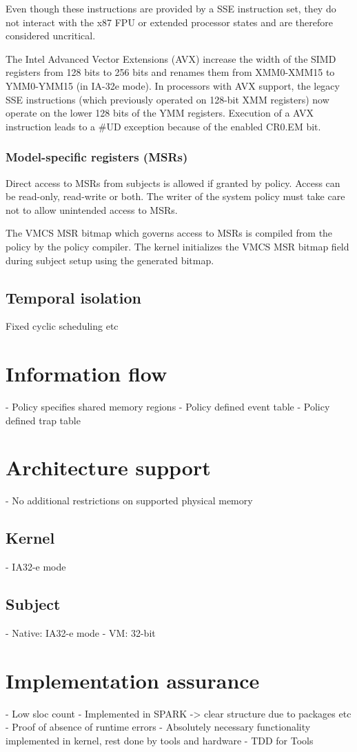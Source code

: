 Even though these instructions are provided by a SSE instruction set, they do
not interact with the x87 FPU or extended processor states and are therefore
considered uncritical.

The Intel Advanced Vector Extensions (AVX) increase the width of the
SIMD registers from 128 bits to 256 bits and renames them from XMM0-XMM15 to
YMM0-YMM15 (in IA-32e mode). In processors with AVX support, the legacy SSE
instructions (which previously operated on 128-bit XMM registers) now operate on
the lower 128 bits of the YMM registers. Execution of a AVX instruction leads to
a \#UD exception because of the enabled CR0.EM bit.

\subsubsection{Model-specific registers (MSRs)}
Direct access to MSRs from subjects is allowed if granted by policy. Access can
be read-only, read-write or both. The writer of the system policy must take care
not to allow unintended access to MSRs.

The VMCS MSR bitmap which governs access to MSRs is compiled from the policy by
the policy compiler. The kernel initializes the VMCS MSR bitmap field during
subject setup using the generated bitmap.

\subsection{Temporal isolation}
Fixed cyclic scheduling etc

\section{Information flow}
- Policy specifies shared memory regions
- Policy defined event table
- Policy defined trap table

\section{Architecture support}
- No additional restrictions on supported physical memory

\subsection{Kernel}
- IA32-e mode

\subsection{Subject}
- Native: IA32-e mode
- VM: 32-bit

\section{Implementation assurance}
- Low sloc count
- Implemented in SPARK -> clear structure due to packages etc
- Proof of absence of runtime errors
- Absolutely necessary functionality implemented in kernel, rest done by tools
  and hardware
- TDD for Tools
